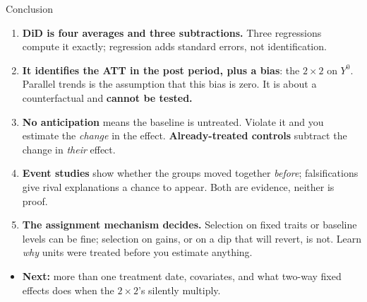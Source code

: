 \documentclass[
  11pt,
  ignorenonframetext,
  aspectratio=169,
]{beamer}
\providecommand{\tightlist}{%
  \setlength{\itemsep}{0pt}\setlength{\parskip}{0pt}}
\begin{document}
\begin{frame}{Conclusion}
\protect{}\label{conclusion}
\begin{enumerate}
\tightlist
\item
  \textbf{DiD is four averages and three subtractions.} Three
  regressions compute it exactly; regression adds standard errors, not
  identification.
\item
  \textbf{It identifies the ATT in the post period, plus a bias}: the
  \(2 \times 2\) on \(Y^0\). Parallel trends is the assumption that this
  bias is zero. It is about a counterfactual and \textbf{cannot be
  tested.}
\item
  \textbf{No anticipation} means the baseline is untreated. Violate it
  and you estimate the \emph{change} in the effect.
  \textbf{Already-treated controls} subtract the change in \emph{their}
  effect.
\item
  \textbf{Event studies} show whether the groups moved together
  \emph{before}; falsifications give rival explanations a chance to
  appear. Both are evidence, neither is proof.
\item
  \textbf{The assignment mechanism decides.} Selection on fixed traits
  or baseline levels can be fine; selection on gains, or on a dip that
  will revert, is not. Learn \emph{why} units were treated before you
  estimate anything.
\end{enumerate}

\vspace{0.3em}

\begin{itemize}
\tightlist
\item
  \textbf{Next:} more than one treatment date, covariates, and what
  two-way fixed effects does when the \(2 \times 2\)'s silently
  multiply.
\end{itemize}
\end{frame}
\end{document}
